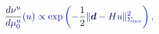 \documentclass[12pt]{article}
\begin{document}
\makeatletter
\renewcommand*{\@textcolor}[3]{%
  \protect\leavevmode
  \begingroup
    \color#1{#2}#3%
  \endgroup
}
\makeatother
\begin{displaymath}
\mathcolor[RGB]{0,0,15}{\frac { \mathcolor[RGB]{0,0,30}{d} \mathcolor[RGB]{0,0,45}{\nu} ^ { \mathcolor[RGB]{0,0,60}{u} } } { \mathcolor[RGB]{0,0,75}{d} \mathcolor[RGB]{0,0,90}{\mu} _ { \mathcolor[RGB]{0,0,105}{0} } ^ { \mathcolor[RGB]{0,0,120}{u} } } } \mathcolor[RGB]{0,0,135}{(} \mathcolor[RGB]{0,0,150}{u} \mathcolor[RGB]{0,0,165}{)} \mathcolor[RGB]{0,0,180}{\propto} \mathrm { \mathcolor[RGB]{0,0,195}{e} \mathcolor[RGB]{0,0,210}{x} \mathcolor[RGB]{0,0,225}{p} } \mathcolor[RGB]{0,0,240}{\left(} \mathcolor[RGB]{0,0,255}{-} \mathcolor[RGB]{0,15,0}{\frac { \mathcolor[RGB]{0,15,15}{1} } { \mathcolor[RGB]{0,15,30}{2} } } \mathcolor[RGB]{0,15,45}{\|} \boldsymbol { \mathcolor[RGB]{0,15,60}{d} } \mathcolor[RGB]{0,15,75}{-} \mathcolor[RGB]{0,15,90}{H} \mathcolor[RGB]{0,15,105}{u} \mathcolor[RGB]{0,15,120}{\|} _ { \mathcolor[RGB]{0,15,135}{\Sigma} _ { \mathrm { \mathcolor[RGB]{0,15,150}{i} \mathcolor[RGB]{0,15,165}{n} \mathcolor[RGB]{0,15,180}{v} } } } ^ { \mathcolor[RGB]{0,15,195}{2} } \mathcolor[RGB]{0,15,210}{\right)} \mathcolor[RGB]{0,15,225}{,}
\end{displaymath}
\end{document}
